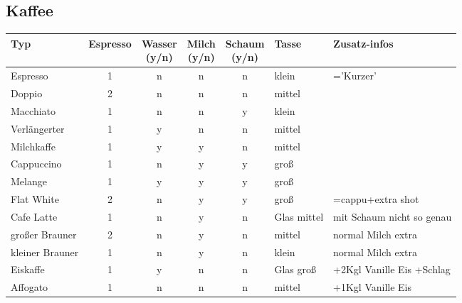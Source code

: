 \documentclass[12pt]{article}
\begin{document}
\clearpage
\subsection{Kaffee}
\begin{tabularx}{\textwidth}{|X|c|c|c|c|l|X|}
    \hline
    Typ &
    Espresso &
    \makecell{Wasser\\(y/n)} &
    \makecell{Milch \\ (y/n)} &
    \makecell{Schaum \\ (y/n)} &
    Tasse &
    Zusatz-infos\\
    \hline
    Espresso    & 1     & n & n & n & klein     & ='Kurzer' \\\arrayrulecolor{gray}\hdashline\arrayrulecolor{black}
    Doppio      & 2     & n & n & n & mittel    & \\\arrayrulecolor{gray}\hdashline\arrayrulecolor{black}
    Macchiato   & 1     & n & n & y & klein & \\\arrayrulecolor{gray}\hdashline\arrayrulecolor{black}
    Verlängerter & 1    & y & n & n & mittel    & \\\arrayrulecolor{gray}\hdashline\arrayrulecolor{black}
    Milchkaffe  & 1     & y & y & n & mittel    & \\\arrayrulecolor{gray}\hdashline\arrayrulecolor{black}
    Cappuccino  & 1     & n & y & y & groß      & \\\arrayrulecolor{gray}\hdashline\arrayrulecolor{black}
    Melange     & 1     & y & y & y & groß      & \\\arrayrulecolor{gray}\hdashline\arrayrulecolor{black}
    Flat White  & 2     & n & y & y & groß      & =cappu+extra shot \\\arrayrulecolor{gray}\hdashline\arrayrulecolor{black}
    Cafe Latte  & 1     & n & y & n & Glas mittel & mit Schaum nicht so genau \\\arrayrulecolor{gray}\hdashline\arrayrulecolor{black}
    großer Brauner & 2  & n & y & n & mittel    & normal Milch extra \\\arrayrulecolor{gray}\hdashline\arrayrulecolor{black}
    kleiner Brauner & 1 & n & y & n & klein     & normal Milch extra \\\arrayrulecolor{gray}\hdashline\arrayrulecolor{black}
    Eiskaffe    & 1     & y & n & n & Glas groß & +2Kgl Vanille Eis +Schlag \\\arrayrulecolor{gray}\hdashline\arrayrulecolor{black}
    Affogato    & 1     & n & n & n & mittel    & +1Kgl Vanille Eis \\
    \hline
\end{tabularx}
\end{document}
